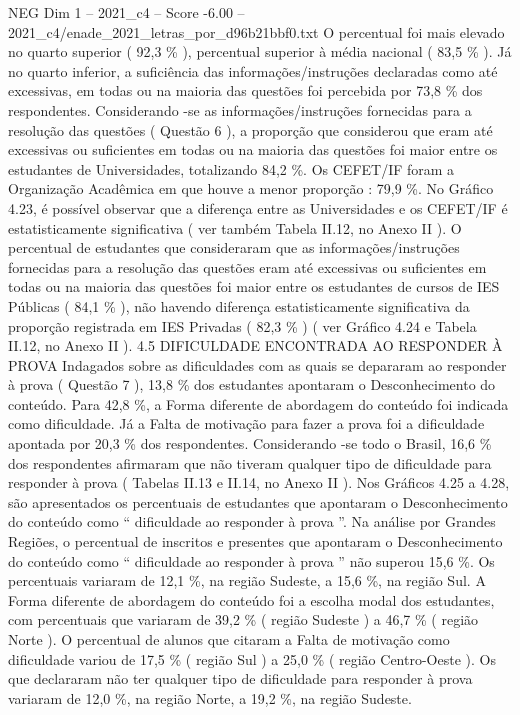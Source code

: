 \begin{textsample}{NEG Dim 1 – 2021\_c4 – Score -6.00 – 2021\_c4/enade\_2021\_letras\_por\_d96b21bbf0.txt}
O percentual foi mais elevado no quarto superior ( 92,3 \% ), percentual superior à média nacional ( 83,5 \% ).
Já no quarto inferior, a suficiência das informações/instruções declaradas como até excessivas, em todas ou na maioria das questões foi percebida por 73,8 \% dos respondentes.
Considerando -se as informações/instruções fornecidas para a resolução das questões ( Questão 6 ), a proporção que considerou que eram até excessivas ou suficientes em todas ou na maioria das questões foi maior entre os estudantes de Universidades, totalizando 84,2 \%.
Os CEFET/IF foram a Organização Acadêmica em que houve a menor proporção : 79,9 \%.
No Gráfico 4.23, é possível observar que a diferença entre as Universidades e os CEFET/IF é estatisticamente significativa ( ver também Tabela II.12, no Anexo II ).
O percentual de estudantes que consideraram que as informações/instruções fornecidas para a resolução das questões eram até excessivas ou suficientes em todas ou na maioria das questões foi maior entre os estudantes de cursos de IES Públicas ( 84,1 \% ), não havendo diferença estatisticamente significativa da proporção registrada em IES Privadas ( 82,3 \% ) ( ver Gráfico 4.24 e Tabela II.12, no Anexo II ). 4.5 DIFICULDADE ENCONTRADA AO RESPONDER À PROVA Indagados sobre as dificuldades com as quais se depararam ao responder à prova ( Questão 7 ), 13,8 \% dos estudantes apontaram o Desconhecimento do conteúdo.
Para 42,8 \%, a Forma diferente de abordagem do conteúdo foi indicada como dificuldade.
Já a Falta de motivação para fazer a prova foi a dificuldade apontada por 20,3 \% dos respondentes.
Considerando -se todo o Brasil, 16,6 \% dos respondentes afirmaram que não tiveram qualquer tipo de dificuldade para responder à prova ( Tabelas II.13 e II.14, no Anexo II ).
Nos Gráficos 4.25 a 4.28, são apresentados os percentuais de estudantes que apontaram o Desconhecimento do conteúdo como “ dificuldade ao responder à prova ”.
Na análise por Grandes Regiões, o percentual de inscritos e presentes que apontaram o Desconhecimento do conteúdo como “ dificuldade ao responder à prova ” não superou 15,6 \%.
Os percentuais variaram de 12,1 \%, na região Sudeste, a 15,6 \%, na região Sul.
A Forma diferente de abordagem do conteúdo foi a escolha modal dos estudantes, com percentuais que variaram de 39,2 \% ( região Sudeste ) a 46,7 \% ( região Norte ).
O percentual de alunos que citaram a Falta de motivação como dificuldade variou de 17,5 \% ( região Sul ) a 25,0 \% ( região Centro-Oeste ).
Os que declararam não ter qualquer tipo de dificuldade para responder à prova variaram de 12,0 \%, na região Norte, a 19,2 \%, na região Sudeste.

\end{textsample}
